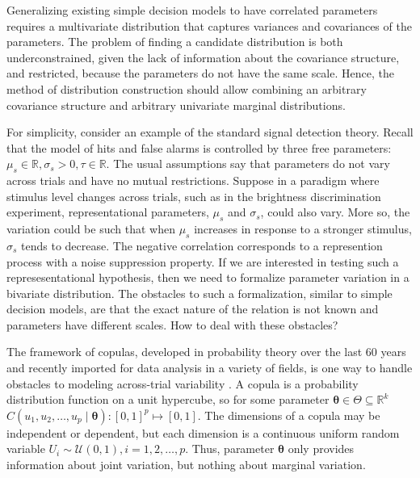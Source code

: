 \documentclass[12pt]{report}
\begin{document}
Generalizing existing simple decision models to have correlated parameters requires a multivariate distribution that captures variances and covariances of the parameters. The problem of finding a candidate distribution is both underconstrained, given the lack of information about the covariance structure, and restricted, because the parameters do not have the same scale. Hence, the method of distribution construction should allow combining an arbitrary covariance structure and arbitrary univariate marginal distributions.

For simplicity, consider an example of the standard signal detection theory. Recall that the model of hits and false alarms is controlled by three free parameters: $\mu_s \in \mathbb{R}, \sigma_s > 0, \tau \in \mathbb{R}$. The usual assumptions say that parameters do not vary across trials and have no mutual restrictions. Suppose in a paradigm where stimulus level changes across trials, such as in the \citet{RatRou1998} brightness discrimination experiment, representational parameters, $\mu_s$ and $\sigma_s$, could also vary. More so, the variation could be such that when $\mu_s$ increases in response to a stronger stimulus, $\sigma_s$ tends to decrease. The negative correlation corresponds to a represention process with a noise suppression property. If we are interested in testing such a represesentational hypothesis, then we need to formalize parameter variation in a bivariate distribution. The obstacles to such a formalization, similar to simple decision models, are that the exact nature of the relation is not known and parameters have different scales. How to deal with these obstacles?

The framework of copulas, developed in probability theory over the last 60
years and recently imported for data analysis in a variety of fields, is one way to handle obstacles to modeling across-trial variability
\citep{Skl1959,Joe1997,Nel2007,BerWoo2008}. A copula is a probability
distribution function on a unit hypercube, so for some parameter $\boldsymbol{\theta} \in \Theta \subseteq \mathbb{R}^k$ $C(u_1, u_2, \ldots, u_p \mid \boldsymbol{\theta}): [0, 1]^p \mapsto [0, 1]$.  The dimensions of a copula may be independent or dependent, but each dimension is a continuous uniform random variable $U_i \sim \mathcal{U}(0, 1), i = 1, 2, \ldots, p$. Thus, parameter $\boldsymbol{\theta}$ only provides information about joint variation, but nothing about marginal variation.
\end{document}
